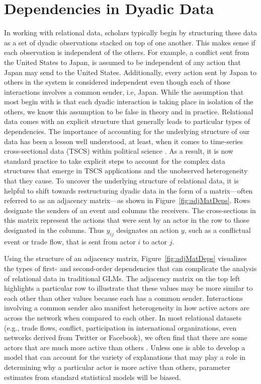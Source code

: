 \section{\textbf{Dependencies in Dyadic Data}}

In working with relational data, scholars typically begin by structuring these data as a set of dyadic observations stacked on top of one another. This makes sense if each observation is independent of the others. For example, a conflict sent from the United States to Japan, is assumed to be independent of any action that Japan may send to the United States. Additionally, every action sent by Japan to others in the system is considered independent even though each of those interactions involves a common sender, i.e, Japan. While the assumption that most begin with is that each dyadic interaction is taking place in isolation of the others, we know this assumption to be false in theory and in practice. Relational data comes with an explicit structure that generally leads to particular types of dependencies. The importance of accounting for the underlying structure of our data has been a lesson well understood, at least, when it comes to time-series cross-sectional data (TSCS) within political science \citep{beck:katz:1995,beck:etal:1998}. As a result, it is now standard practice to take explicit steps to account for the complex data structures that emerge in TSCS applications and the unobserved heterogeneity that they cause. To uncover the underlying structure of relational data, it is helpful to shift towards restructuring dyadic data in the form of a matrix---often referred to as an adjacency matrix---as shown in Figure~\ref{fig:adjMatDeps}. Rows designate the senders of an event and columns the receivers. The cross-sections in this matrix represent the actions that were sent by an actor in the row to those designated in the columns. Thus $y_{ij}$ designates an action $y$, such as a conflictual event or trade flow, that is sent from actor $i$ to actor $j$. 

Using the structure of an adjacency matrix, Figure~\ref{fig:adjMatDeps} visualizes the types of first- and second-order dependencies that can complicate the analysis of relational data in traditional GLMs. The adjacency matrix on the top left highlights a particular row to illustrate that these values may be more similar to each other than other values because each has a common sender. Interactions involving a common sender also manifest heterogeneity in how active actors are across the network when compared to each other. In most relational datasets (e.g., trade flows, conflict, participation in international organizations, even networks derived from Twitter or Facebook), we often find that there are some actors that are much more active than others \citep{barabasi:reka:1999}. Unless one is able to develop a model that can account for the variety of explanations that may play a role in determining why a particular actor is more active than others, parameter estimates from standard statistical models will be biased.

